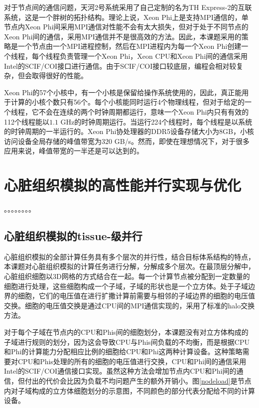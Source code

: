 对于节点间的通信问题，天河2号系统采用了自己定制的名为TH Express-2的互联系统，这是一个胖树的拓扑结构。理论上说，Xeon Phi上是支持MPI通信的，单节点内Xeon Phi间采用MPI通信对性能不会有太大损失，但对于处于不同节点的Xeon Phi间的通信，采用MPI通信并不是很高效的方法。因此，本课题采用的策略是一个节点由一个MPI进程控制，然后在MPI进程内为每一个Xeon Phi创建一个线程，每个线程负责管理一个Xeon Phi，Xeon CPU和Xeon Phi间的通信采用Intel的SCIF/COI接口进行通信。由于SCIF/COI接口较底层，编程会相对较复杂，但会取得很好的性能。

Xeon Phi的57个小核中，有一个小核是保留给操作系统使用的，因此，真正能用于计算的小核个数只有56个。每个小核能同时运行4个物理线程，但对于给定的一个线程，它不会在连续的两个时钟周期都运行，意味一个Xeon Phi内只有有效的112个线程能以$1.1$ GHz的时钟周期运行。当运行224个线程时，每个线程是以系统的时钟周期的一半运行的。Xeon Phi协处理器的DDR5设备存储大小为8GB，小核访问设备全局存储的峰值带宽为$320$ GB/s。然而，即使在理想情况下，对于很多应用来说，峰值带宽的一半还是可以达到的。


\section{心脏组织模拟的高性能并行实现与优化}

。。。。。。。。

\subsection{心脏组织模拟的tissue-级并行}
心脏组织模拟的全部计算任务具有多个层次的并行性，结合目标体系结构的特点，本课题对心脏组织模拟的计算任务进行分解，分解成多个层次。在最顶层分解中，心脏组织细胞以3D网格的方式结合在一起。每一个计算节点被分配到一定数量的细胞进行处理，这些细胞构成一个子域，子域的形状也是一个立方体。处于子域边界的细胞，它们的电压值在进行扩撒计算前需要与相邻的子域边界的细胞的电压值交换。细胞的电压值交换是通过CPU间的MPI通信实现的，采用了标准的halo交换方法。

对于每个子域在节点内的CPU和Phis间的细胞划分，本课题没有对立方体构成的子域进行规则的划分，因为这会导致CPU与Phis间负载的不均衡，而是根据CPU和Phi的计算能力分配相应比例的细胞给CPU和Phi这两种计算设备。这种策略需要对CPU和Phis处理的所有的细胞的电压值进行交换，CPU和Phi间的通信采用Intel的SCIF/COI通信接口实现。虽然这种方法会增加节点内CPU和Phi间的通信，但付出的代价会比因为负载不均问题产生的额外开销小。图\ref{nodeload}是节点内对子域构成的立方体细胞划分的示意图，不同颜色的部分代表分配给不同的计算设备。

